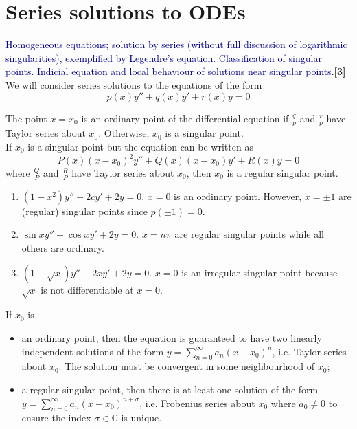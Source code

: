 \documentclass[a4paper]{article}
\begin{document}
\section{Series solutions to ODEs}
{\small\textcolor{darkblue}{Homogeneous equations; solution by series (without full discussion of logarithmic singularities), exemplified by Legendre's equation. Classification of singular points. Indicial equation and local behaviour of solutions near singular points.}\hfill\textbf{[3]}}\\[5pt]
We will consider series solutions to the equations of the form
\begin{equation}
  p(x) y'' + q(x) y' + r(x) y = 0\tag{7.1}
\end{equation}
\begin{defi}
  The point $x = x_0$ is an ordinary point of the differential equation if $\frac{q}{p}$ and $\frac{r}{p}$ have Taylor series about $x_0$. Otherwise, $x_0$ is a singular point.\\[5pt]
  If $x_0$ is a singular point but the equation can be written as
\begin{equation}  
P(x)(x - x_0)^2y'' + Q(x)(x - x_0)y' + R(x)y = 0\tag{7.2}
\end{equation}
  where $\frac{Q}{P}$ and $\frac{R}{P}$ have Taylor series about $x_0$, then $x_0$ is a regular singular point.
\end{defi}

\begin{eg}\leavevmode
  \begin{enumerate}
    \item $(1 - x^2)y'' - 2cy' + 2y = 0$. $x = 0$ is an ordinary point. However, $x = \pm 1$ are (regular) singular points since $p(\pm 1) = 0$.
    \item $\sin x y'' + \cos x y' + 2y = 0$. $x = n\pi$ are regular singular points while all others are ordinary.
    \item $(1 + \sqrt{x}) y'' - 2xy' + 2y = 0$. $x = 0$ is an irregular singular point because $\sqrt{x}$ is not differentiable at $x = 0$.
  \end{enumerate}
\end{eg}
\begin{prop}
If $x_0$ is
\begin{itemize}
    \item an ordinary point, then the equation is guaranteed to have two linearly independent solutions of the form $y=\sum_{n=0}^\infty a_n(x-x_0)^n$, i.e. Taylor series about $x_0$. The solution must be convergent in some neighbourhood of $x_0$;
    \item a regular singular point, then there is at least one solution of the form $y=\sum_{n=0}^\infty a_n(x-x_0)^{n+\sigma}$, i.e. Frobenius series about $x_0$ where $a_0\neq 0$ to ensure the index $\sigma\in\mathbb{C}$ is unique.
\end{itemize}
\end{prop}
\end{document}
